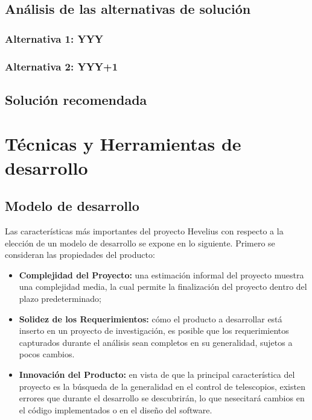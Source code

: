 \documentclass[letterpaper,spanish,10pt]{article}
\begin{document}
\subsection{An\'alisis de las alternativas de soluci\'on}
\subsubsection{Alternativa 1: YYY} %



\subsubsection{Alternativa 2: YYY+1} %



\subsection{Soluci\'on recomendada} %



\newpage
\section{T\'ecnicas y Herramientas de desarrollo} %
\subsection{Modelo de desarrollo}
Las caracter\'isticas m\'as importantes del proyecto Hevelius con
respecto a la elecci\'on de un modelo de desarrollo se expone en lo
siguiente. Primero se consideran las propiedades del producto:

\begin{itemize}
\item \textbf{Complejidad del Proyecto:} una estimaci\'on informal del proyecto
  muestra una complejidad media, la cual permite la finalizaci\'on del
  proyecto dentro del plazo predeterminado;
\item \textbf{Solidez de los Requerimientos:} c\'omo el producto a
  desarrollar est\'a inserto en un proyecto de investigaci\'on, es posible que
  los requerimientos capturados durante el an\'alisis sean completos en su generalidad,
  sujetos a pocos cambios.
\item \textbf{Innovaci\'on del Producto:} en vista de que la principal caracter\'istica
  del proyecto es la b\'usqueda de la generalidad en el control de telescopios, existen 
  errores que durante el desarrollo se descubrir\'an, lo que nesecitar\'a cambios en el
  c\'odigo implementados o en el dise\~no del software.
\end{itemize}
\end{document}
